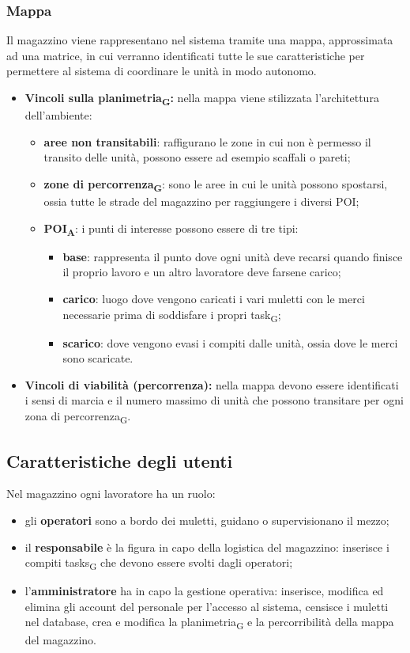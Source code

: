 \subsubsection{Mappa}
Il magazzino viene rappresentano nel sistema tramite una mappa, approssimata ad una matrice, in cui verranno identificati tutte le sue caratteristiche per permettere al sistema di coordinare le unità in modo autonomo.
\begin{itemize}
	\item \textbf{Vincoli sulla \gls{planimetria}\textsubscript{G}:} nella mappa viene stilizzata l'architettura dell'ambiente:
	\begin{itemize}
		\item \textbf{aree non transitabili}: raffigurano le zone in cui non è permesso il transito delle unità, possono essere ad esempio scaffali o pareti;
		\item \textbf{zone di \gls{percorrenza}\textsubscript{G}}: sono le aree in cui le unità possono spostarsi, ossia tutte le strade del magazzino per raggiungere i diversi POI;
		\item \textbf{\acrshort{POI}\textsubscript{A}}: i punti di interesse possono essere di tre tipi:
		\begin{itemize}
			\item \textbf{base}: rappresenta il punto dove ogni unità deve recarsi quando finisce il proprio lavoro e un altro lavoratore deve farsene carico;
			\item \textbf{carico}: luogo dove vengono caricati i vari muletti con le merci necessarie prima di soddisfare i propri \gls{task}\textsubscript{G};
			\item \textbf{scarico}: dove vengono evasi i compiti dalle unità, ossia dove le merci sono scaricate.
		\end{itemize}
	\end{itemize}
	\item \textbf{Vincoli di viabilità (percorrenza):} nella mappa devono essere identificati i sensi di marcia e il numero massimo di unità che possono transitare per ogni zona di \gls{percorrenza}\textsubscript{G}.
	
\end{itemize}

\subsection{Caratteristiche degli utenti}
Nel magazzino ogni lavoratore ha un ruolo: 
\begin{itemize}
	\item gli \textbf{operatori} sono a bordo dei muletti, guidano o supervisionano il mezzo;
	\item il \textbf{responsabile} è la figura in capo della logistica del magazzino: inserisce i compiti \glspl{task}\textsubscript{G} che devono essere svolti dagli operatori; 
	\item l'\textbf{amministratore} ha in capo la gestione operativa: inserisce, modifica ed elimina gli account del personale per l'accesso al sistema, censisce i muletti nel database, crea e modifica la \gls{planimetria}\textsubscript{G} e la percorribilità della mappa del magazzino.
\end{itemize}
